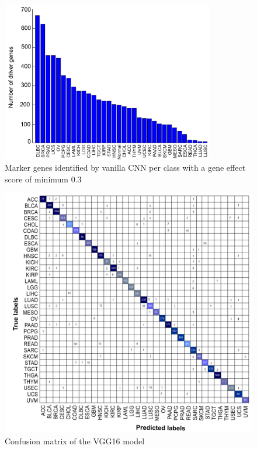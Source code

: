 \iffalse
\begin{figure}[h]
    \centering
	\includegraphics[width=0.8\linewidth,height=70mm]{images/driver_genes.png}
	\caption{Marker genes identified by vanilla CNN per class with a gene effect score of minimum 0.3}
    \label{fig:dg_cnn}
\end{figure}
\begin{figure}[h]
\centering
	\includegraphics[scale=0.5]{images/conf_uni_modal.png}
	\caption{Confusion matrix of the VGG16 model}
    \label{fig:conf_cnn}
    \vspace{-4mm}
\end{figure}


